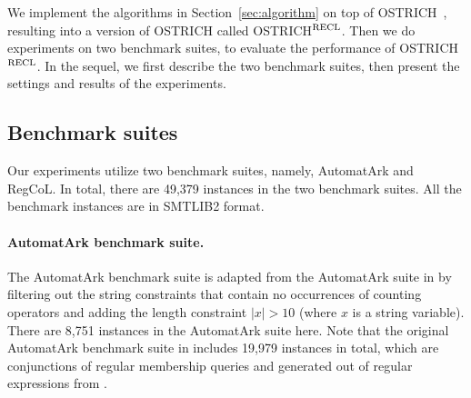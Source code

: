 %

We implement the algorithms in Section~\ref{sec:algorithm} on top of OSTRICH~\cite{ostrich,atva2020}, resulting into a version of OSTRICH called OSTRICH$^{\rm RECL}$.
Then we do experiments on two benchmark suites, to evaluate the performance of OSTRICH$^{\rm RECL}$. In the sequel, we first describe the two benchmark suites, then present the settings and results of the experiments. 


\subsection{Benchmark suites}

Our experiments utilize two benchmark suites, namely, AutomatArk and RegCoL. In total, there are 49,379 instances in the two benchmark suites. All the benchmark instances are in SMTLIB2 format. 

\paragraph*{AutomatArk benchmark suite.}
The AutomatArk benchmark suite is adapted from the AutomatArk suite in \cite{z3str3re} by filtering out the string constraints that contain no occurrences of counting operators and adding the length constraint $|x| > 10$ (where $x$ is a string variable). There are 8,751 instances in the AutomatArk suite here.
Note that the original AutomatArk benchmark suite in \cite{z3str3re} includes 19,979 instances in total, which are conjunctions of regular membership queries and generated out of regular expressions from \cite{automatark}. 

